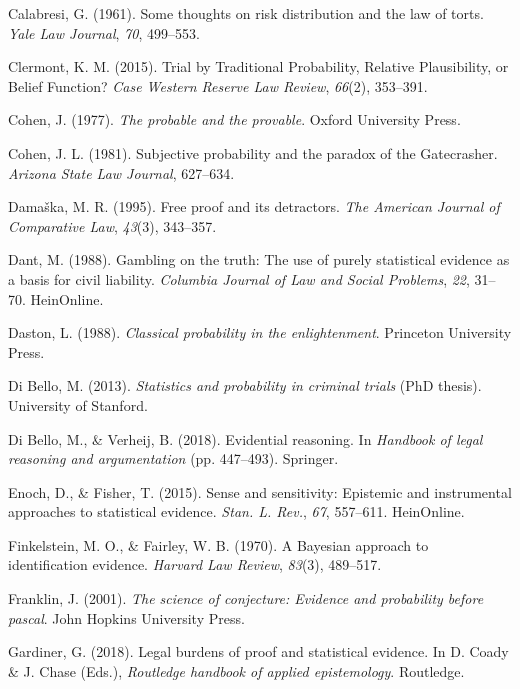 \documentclass[11pt,dvipsnames,enabledeprecatedfontcommands]{scrartcl}
\begin{document}
\hypertarget{ref-Calabresi1961}{}
Calabresi, G. (1961). Some thoughts on risk distribution and the law of
torts. \emph{Yale Law Journal}, \emph{70}, 499--553.

\hypertarget{ref-clermont2015TrialTraditionalProbability}{}
Clermont, K. M. (2015). Trial by Traditional Probability, Relative
Plausibility, or Belief Function? \emph{Case Western Reserve Law
Review}, \emph{66}(2), 353--391.

\hypertarget{ref-Cohen1977The-probable-an}{}
Cohen, J. (1977). \emph{The probable and the provable}. Oxford
University Press.

\hypertarget{ref-Cohen81}{}
Cohen, J. L. (1981). Subjective probability and the paradox of the
Gatecrasher. \emph{Arizona State Law Journal}, 627--634.

\hypertarget{ref-damaska1996free}{}
Damaška, M. R. (1995). Free proof and its detractors. \emph{The American
Journal of Comparative Law}, \emph{43}(3), 343--357.

\hypertarget{ref-dant1988gambling}{}
Dant, M. (1988). Gambling on the truth: The use of purely statistical
evidence as a basis for civil liability. \emph{Columbia Journal of Law
and Social Problems}, \emph{22}, 31--70. HeinOnline.

\hypertarget{ref-daston1988}{}
Daston, L. (1988). \emph{Classical probability in the enlightenment}.
Princeton University Press.

\hypertarget{ref-di2013statistics}{}
Di Bello, M. (2013). \emph{Statistics and probability in criminal
trials} (PhD thesis). University of Stanford.

\hypertarget{ref-di2018evidential}{}
Di Bello, M., \& Verheij, B. (2018). Evidential reasoning. In
\emph{Handbook of legal reasoning and argumentation} (pp. 447--493).
Springer.

\hypertarget{ref-enoch2015sense}{}
Enoch, D., \& Fisher, T. (2015). Sense and sensitivity: Epistemic and
instrumental approaches to statistical evidence. \emph{Stan. L. Rev.},
\emph{67}, 557--611. HeinOnline.

\hypertarget{ref-Finkelstein1970A}{}
Finkelstein, M. O., \& Fairley, W. B. (1970). A Bayesian approach to
identification evidence. \emph{Harvard Law Review}, \emph{83}(3),
489--517.

\hypertarget{ref-Franklin2001}{}
Franklin, J. (2001). \emph{The science of conjecture: Evidence and
probability before pascal}. John Hopkins University Press.

\hypertarget{ref-gardiner2018}{}
Gardiner, G. (2018). Legal burdens of proof and statistical evidence. In
D. Coady \& J. Chase (Eds.), \emph{Routledge handbook of applied
epistemology}. Routledge.
\end{document}
